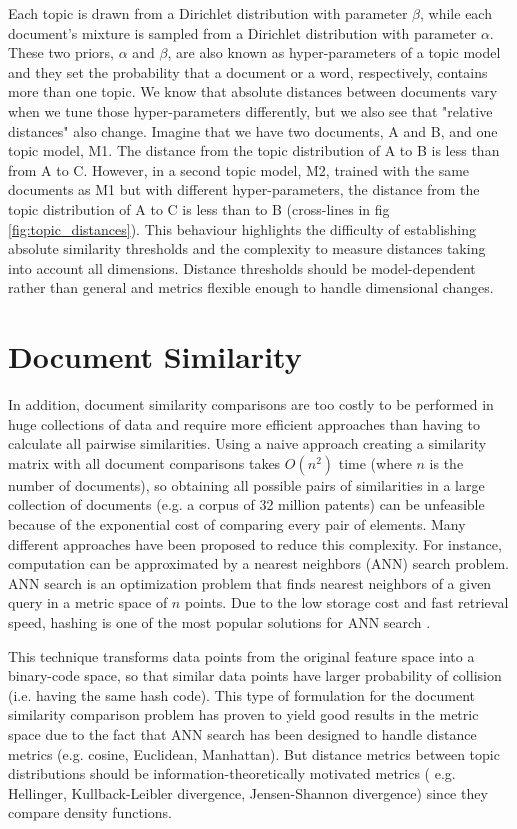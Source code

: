 Each topic is drawn from a Dirichlet distribution with parameter $\beta$, while each document's mixture is sampled from a Dirichlet distribution with parameter $\alpha$. These two priors, $\alpha$ and $\beta$, are also known as hyper-parameters of a topic model and they set the probability that a document or a word, respectively, contains more than one topic. We know that absolute distances between documents vary when we tune those hyper-parameters differently, but we also see that "relative distances" also change. Imagine that we have two documents, A and B, and one topic model, M1. The distance from the topic distribution of A to B is less than from A to C. However, in a second topic model, M2, trained with the same documents as M1 but with different hyper-parameters, the distance from the topic distribution of A to C is less than to B (cross-lines in fig \ref{fig:topic_distances}). This behaviour highlights the difficulty of establishing absolute similarity thresholds and the complexity to measure distances taking into account all dimensions. Distance thresholds should be model-dependent rather than general and metrics flexible enough to handle dimensional changes. 


\section{Document Similarity}

In addition, document similarity comparisons are too costly to be performed in huge collections of data and require more efficient approaches than having to calculate all pairwise similarities. Using a naive approach creating a similarity matrix with all document comparisons takes $O(n^2)$ time (where $n$ is the number of documents), so obtaining all possible pairs of similarities in a large collection of documents (e.g. a corpus of 32 million patents) can be unfeasible because of the exponential cost of comparing every pair of elements. Many different approaches have been proposed to reduce this complexity. For instance, computation can be approximated by a nearest neighbors (ANN) search problem. ANN search is an optimization problem that finds nearest neighbors of a given query in a metric space of $n$ points. Due to the low storage cost and fast retrieval speed, hashing is one of the most popular solutions for ANN search \citep{Zhen2016}. 

This technique transforms data points from the original feature space into a binary-code space, so that similar data points have larger probability of collision (i.e. having the same hash code). This type of formulation for the document similarity comparison problem has proven to yield good results in the metric space \citep{Krstovski2011} due to the fact that ANN search has been designed to handle distance metrics (e.g. cosine, Euclidean, Manhattan). But distance metrics between topic distributions should be information-theoretically motivated metrics ( e.g. Hellinger, Kullback-Leibler divergence, Jensen-Shannon divergence) since they compare density functions. 

